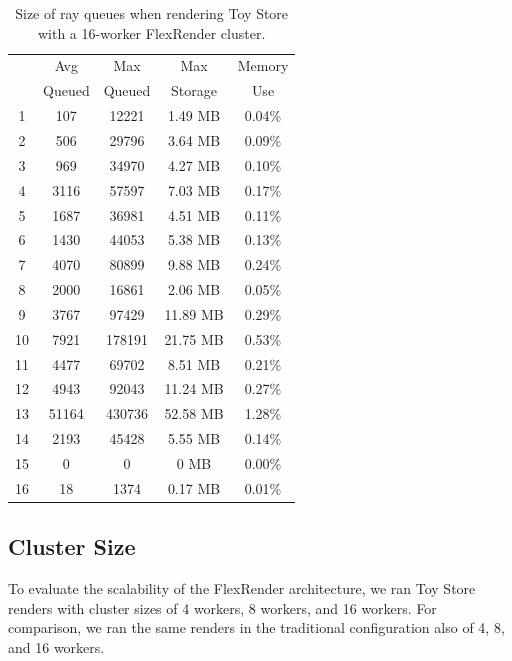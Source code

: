 \documentclass[a4paper,twoside]{article}
\begin{document}
\begin{table}
\begin{center}
\begin{tabular}{|c||c|c|c|c|}
    \hline
    & Avg  & Max & Max & Memory \\
    & Queued & Queued & Storage & Use \\
    \hline
    \hline
    1 & 107 & 12221 & 1.49 MB & 0.04\% \\
    \hline
    2 & 506 & 29796 & 3.64 MB & 0.09\% \\
    \hline
    3 & 969 & 34970 & 4.27 MB & 0.10\% \\
    \hline
    4 & 3116 & 57597 & 7.03 MB & 0.17\% \\
    \hline
    5 & 1687 & 36981 & 4.51 MB & 0.11\% \\
    \hline
    6 & 1430 & 44053 & 5.38 MB & 0.13\% \\
    \hline
    7 & 4070 & 80899 & 9.88 MB & 0.24\% \\
    \hline
    8 & 2000 & 16861 & 2.06 MB & 0.05\% \\
    \hline
    9 & 3767 & 97429 & 11.89 MB & 0.29\% \\
    \hline
    10 & 7921 & 178191 & 21.75 MB & 0.53\% \\
    \hline
    11 & 4477 & 69702 & 8.51 MB & 0.21\% \\
    \hline
    12 & 4943 & 92043 & 11.24 MB & 0.27\% \\
    \hline
    13 & 51164 & 430736 & 52.58 MB & 1.28\% \\
    \hline
    14 & 2193 & 45428 & 5.55 MB & 0.14\% \\
    \hline
    15 & 0 & 0 & 0 MB & 0.00\% \\
    \hline
    16 & 18 & 1374 & 0.17 MB & 0.01\% \\
    \hline
\end{tabular}
\caption{Size of ray queues when rendering Toy Store with a 16-worker FlexRender cluster.}
\label{tb:rayqueues}
\end{center}
\end{table}

\subsection{Cluster Size}
\label{clustersize}

To evaluate the scalability of the FlexRender architecture, we ran Toy Store
renders with cluster sizes of 4 workers, 8 workers, and 16 workers. For
comparison, we ran the same renders in the traditional configuration also of
4, 8, and 16 workers.
\end{document}
